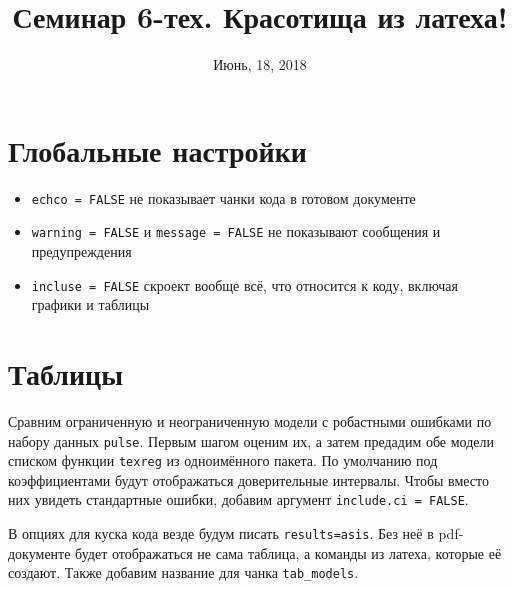 \documentclass[11pt,russian,]{article}
\title{Семинар 6-тех. Красотища из латеха!}
\author{}
\date{Июнь, 18, 2018}
\providecommand{\tightlist}{%
  \setlength{\itemsep}{0pt}\setlength{\parskip}{0pt}}
\begin{document}
\maketitle

\section{Глобальные настройки}\label{-}

\begin{itemize}
\tightlist
\item
  \texttt{echco\ =\ FALSE} не показывает чанки кода в готовом документе
\item
  \texttt{warning\ =\ FALSE} и \texttt{message\ =\ FALSE} не показывают
  сообщения и предупреждения
\item
  \texttt{incluse\ =\ FALSE} скроект вообще всё, что относится к коду,
  включая графики и таблицы
\end{itemize}

\section{Таблицы}

Сравним ограниченную и неограниченную модели с робастными ошибками по
набору данных \texttt{pulse}. Первым шагом оценим их, а затем предадим
обе модели списком функции \texttt{texreg} из одноимённого пакета. По
умолчанию под коэффициентами будут отображаться доверительные интервалы.
Чтобы вместо них увидеть стандартные ошибки, добавим аргумент
\texttt{include.ci\ =\ FALSE}.

В опциях для куска кода везде будум писать
\texttt{results=\textquotesingle{}asis\textquotesingle{}}. Без неё в
pdf-документе будет отображаться не сама таблица, а команды из латеха,
которые её создают. Также добавим название для чанка
\texttt{tab\_models}.
\end{document}
